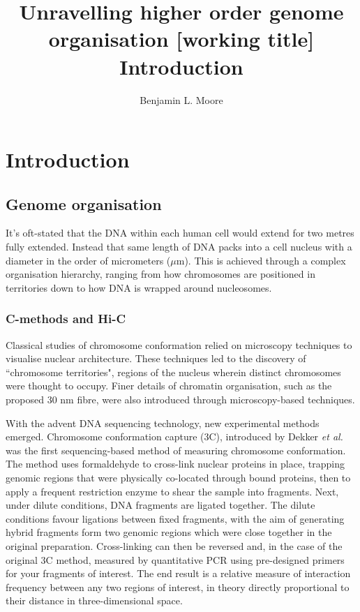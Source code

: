 \documentclass[a4paper,10pt,oneside]{book}
\title{ \vspace{3in} Unravelling higher order genome organisation {\small [working
    title]} \\ \vspace{2em} {\large {\bf Introduction}} }
\author{Benjamin L. Moore}
\begin{document}
\maketitle

\chapter{Introduction}
\section{Genome organisation}

It's oft-stated that the DNA within each human cell would extend for two metres fully extended. Instead that same length of DNA packs into a cell nucleus with a diameter in the order of micrometers ($\mu$m). This is achieved through a complex organisation hierarchy, ranging from how chromosomes are positioned in territories down to how DNA is wrapped around nucleosomes.

\subsection{C-methods and Hi-C}

Classical studies of chromosome conformation relied on microscopy techniques to visualise nuclear architecture. These techniques led to the discovery of ``chromosome territories", regions of the nucleus wherein distinct chromosomes were thought to occupy. Finer details of chromatin organisation, such as the proposed 30 nm fibre, were also introduced through microscopy-based techniques. 

With the advent DNA sequencing technology, new experimental methods emerged. Chromosome conformation capture (3C), introduced by Dekker \emph{et al.}\cite{Dekker2002} was the first sequencing-based method of measuring chromosome conformation. The method uses formaldehyde to cross-link nuclear proteins in place, trapping genomic regions that were physically co-located through bound proteins, then to apply a frequent restriction enzyme to shear the sample into fragments. Next, under dilute conditions, DNA fragments are ligated together. The dilute conditions favour ligations between fixed fragments, with the aim of generating hybrid fragments form two genomic regions which were close together in the original preparation. Cross-linking can then be reversed and, in the case of the original 3C method, measured by quantitative PCR using pre-designed primers for your fragments of interest. The end result is a relative measure of interaction frequency between any two regions of interest, in theory directly proportional to their distance in three-dimensional space.
\end{document}
